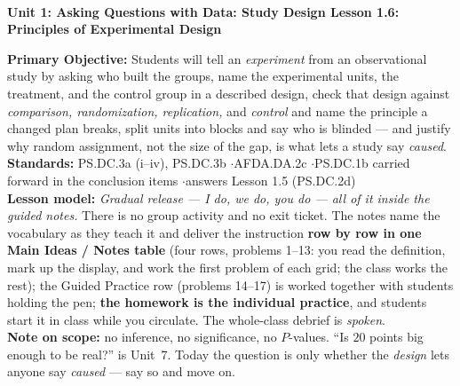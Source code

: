 \documentclass[10pt]{article}
\newcommand{\UnitNumberName}{Unit 1: Asking Questions with Data: Study Design \quad}
\newcommand{\LessonNumberName}{Lesson 1.6: Principles of Experimental Design}
\begin{document}
\begin{center}
    {\Large\bfseries \CourseName \\
    {\small\bfseries \UnitNumberName \LessonNumberName}}
\end{center}

\begin{tcolorbox}[colback=frost, colframe=cerulean, boxrule=0.9pt, arc=2mm,
    left=2mm, right=2mm, top=1.5mm, bottom=1.5mm]
    \textbf{Primary Objective:} Students will tell an \emph{experiment} from an observational
    study by asking who built the groups, name the experimental units, the treatment, and the
    control group in a described design, check that design against \emph{comparison,
    randomization, replication,} and \emph{control} and name the principle a changed plan
    breaks, split units into blocks and say who is blinded --- and justify why random
    assignment, not the size of the gap, is what lets a study say \emph{caused}.
    \\[2pt]
    \textbf{Standards:} PS.DC.3a (i--iv), PS.DC.3b \quad$\cdot$\quad AFDA.DA.2c
    \quad$\cdot$\quad PS.DC.1b carried forward in the conclusion items
    \quad$\cdot$\quad answers Lesson 1.5 (PS.DC.2d)
    \\[2pt]
    \textbf{Lesson model:} \emph{Gradual release --- I do, we do, you do --- all of it inside
    the guided notes.} There is no group activity and no exit ticket. The notes name the
    vocabulary as they teach it and deliver the instruction \textbf{row by row in one Main
    Ideas / Notes table} (four rows, problems 1--13: you read the definition, mark up the
    display, and work the first problem of each grid; the class works the rest); the Guided
    Practice row (problems 14--17) is worked together with students holding the pen;
    \textbf{the homework is the individual practice}, and students start it in class while you
    circulate. The whole-class debrief is \emph{spoken}.
    \\[2pt]
    \textbf{Note on scope:} no inference, no significance, no $P$-values. ``Is $20$ points big
    enough to be real?'' is Unit~7. Today the question is only whether the \emph{design} lets
    anyone say \emph{caused} --- say so and move on.
\end{tcolorbox}
\end{document}
